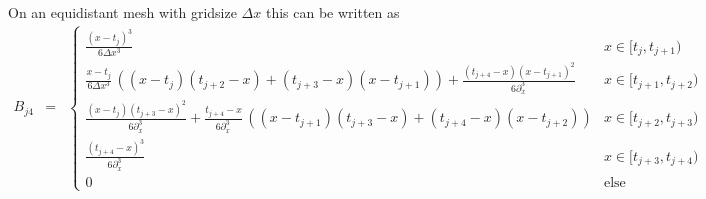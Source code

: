 \documentclass[12pt]{report}
\newcommand{\dx}{\Delta x}
\def\d{\partial}
\def\dx{\d _{x \,}}
\begin{document}
On an equidistant mesh with gridsize $\Delta x$ this can be written as
\begin{eqnarray*}
  B_{j4} &=&
  \begin{cases}
    \frac{(x-t_j)^3}{6\Delta x^3}
    & x\in[t_j,t_{j+1})\\
    \frac{x-t_j}{6\Delta x^3}\,\left(
      (x-t_j)(t_{j+2}-x)
      +(t_{j+3}-x)(x-t_{j+1})
    \right)
    +\frac{(t_{j+4}-x)(x-t_{j+1})^2}{6\dx^3}
     & x\in[t_{j+1},t_{j+2})\\
    \frac{(x-t_j)(t_{j+3}-x)^2}{6\dx^3}
    +\frac{t_{j+4}-x}{6\dx^3}\,\left(
      (x-t_{j+1})(t_{j+3}-x)
      +(t_{j+4}-x)(x-t_{j+2})
  \right)
    & x\in[t_{j+2},t_{j+3})\\
    \frac{(t_{j+4}-x)^3}{6\dx^3}
    & x\in[t_{j+3},t_{j+4})\\
    0 & \mbox{else}
  \end{cases}
\end{eqnarray*}
\end{document}

